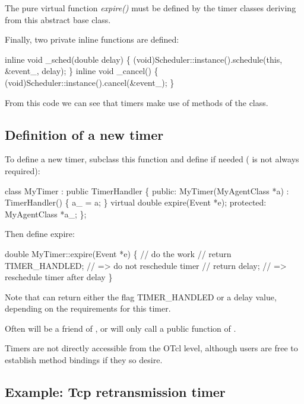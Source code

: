 The pure virtual function {\it expire()} must be defined by the timer classes deriving
from this abstract base class.

Finally, two private inline functions are defined:
\begin{program}
        inline void _sched(double delay) \{
            (void)Scheduler::instance().schedule(this, &event_, delay);
        \}
        inline void _cancel() \{
            (void)Scheduler::instance().cancel(&event_);
        \}
\end{program}

From this code we can see that timers make use of methods of the 
 class.

\subsection{Definition of a new timer}
\label{sec:definition}

To define a new timer, subclass this function and
define  if needed
( is not always required):
\begin{program}
        class MyTimer : public TimerHandler \{
        public:
          MyTimer(MyAgentClass *a) : TimerHandler() \{ a_ = a; \}
          virtual double expire(Event *e);
        protected:
          MyAgentClass *a_;
        \};
\end{program}
Then define expire:
\begin{program}
        double
        MyTimer::expire(Event *e)
        \{
          // {\cf do the work}
          // return TIMER_HANDLED;    // {\cf => do not reschedule timer}
          // return delay;            // {\cf => reschedule timer after delay}
        \}
\end{program}
Note that  can return either the flag TIMER\_HANDLED or a
delay value, depending on the requirements for this timer.

Often  will be a friend of , or 
 will only call a public function of .

Timers are not directly accessible from the OTcl level, although users are
free to establish method bindings if they so desire.

\subsection{Example: Tcp retransmission timer}
\label{sec:timerexample}

